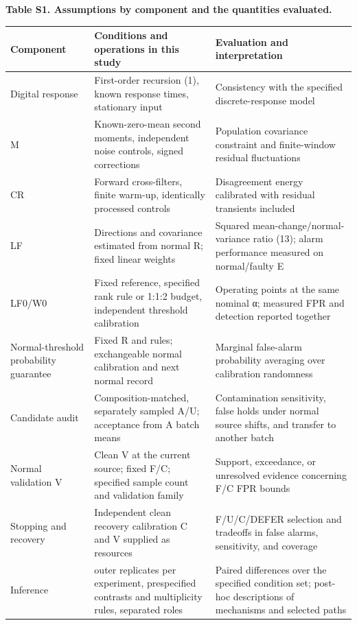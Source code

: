 \documentclass[10pt,a4paper]{article}
\newlength{\usable}
\begin{document}
\begin{table}[H]\fontsize{9.3}{12}\selectfont
\setlength{\usable}{\dimexpr\linewidth-4\tabcolsep\relax}
{\raggedright \textbf{Table S1. Assumptions by component and the quantities evaluated.}\par}\vspace{3pt}
\noindent\begin{tabular}{@{}>{\raggedright\arraybackslash}p{0.17\usable}>{\raggedright\arraybackslash}p{0.44\usable}>{\raggedright\arraybackslash}p{0.39\usable}@{}}
\toprule
\bfseries Component & \bfseries Conditions and operations in this study & \bfseries Evaluation and interpretation \\
\midrule
Digital response & First-order recursion (1), known response times, stationary input & Consistency with the specified discrete-response model \\
M & Known-zero-mean second moments, independent noise controls, signed corrections & Population covariance constraint and finite-window residual fluctuations \\
CR & Forward cross-filters, finite warm-up, identically processed controls & Disagreement energy calibrated with residual transients included \\
LF & Directions and covariance estimated from normal R; fixed linear weights & Squared mean-change/normal-variance ratio (13); alarm performance measured on normal/faulty E \\
LF0/W0 & Fixed reference, specified rank rule or 1:1:2 budget, independent threshold calibration & Operating points at the same nominal α; measured FPR and detection reported together \\
Normal-threshold probability guarantee & Fixed R and rules; exchangeable normal calibration and next normal record & Marginal false-alarm probability averaging over calibration randomness \\
Candidate audit & Composition-matched, separately sampled A/U; acceptance from A batch means & Contamination sensitivity, false holds under normal source shifts, and transfer to another batch \\
Normal validation V & Clean V at the current source; fixed F/C; specified sample count and validation family & Support, exceedance, or unresolved evidence concerning F/C FPR bounds \\
Stopping and recovery & Independent clean recovery calibration C and V supplied as resources & F/U/C/DEFER selection and tradeoffs in false alarms, sensitivity, and coverage \\
Inference & 50 outer replicates per experiment, prespecified contrasts and multiplicity rules, separated roles & Paired differences over the specified condition set; post-hoc descriptions of mechanisms and selected paths \\
\bottomrule\end{tabular}\end{table}
\end{document}
